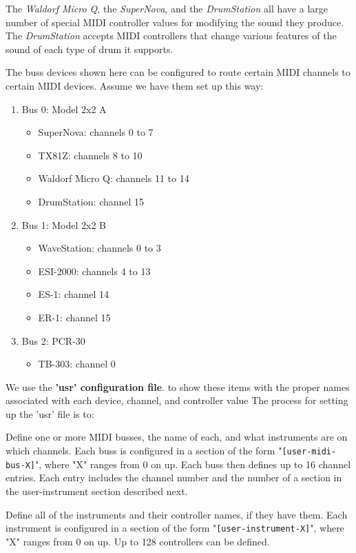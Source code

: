    The \textsl{Waldorf Micro Q},
   the \textsl{SuperNova},
   and the \textsl{DrumStation} all have a large
   number of special MIDI controller values for modifying the sound they
   produce.
   The \textsl{DrumStation} accepts MIDI controllers that change various
   features of the sound of each type of drum it supports.

   The buss devices shown here can be configured to route certain
   MIDI channels to certain MIDI devices.  Assume we have them
   set up this way:

   \begin{enumerate}
      \item Bus 0: Model 2x2 A
      \begin{itemize}
         \item SuperNova: channels 0 to 7
         \item TX81Z: channels 8 to 10
         \item Waldorf Micro Q: channels 11 to 14
         \item DrumStation: channel 15
      \end{itemize}
      \item Bus 1: Model 2x2 B
      \begin{itemize}
         \item WaveStation: channels 0 to 3
         \item ESI-2000: channels 4 to 13
         \item ES-1: channel 14
         \item ER-1: channel 15
      \end{itemize}
      \item Bus 2: PCR-30
      \begin{itemize}
         \item TB-303: channel 0
      \end{itemize}
   \end{enumerate}

   We use the \textbf{'usr' configuration file}.
   to show these items with the proper
   names associated with each device, channel, and controller value
   The process for setting up the 'usr' file is to:

   \begin{enumber}
      \item Define one or more MIDI busses, the name of each, and what
         instruments are on which channels.  Each buss is configured in a
         section of the form "\texttt{[user-midi-bus-X]}", where "X" ranges
         from 0 on up.  Each buss then defines up to 16 channel entries.
         Each entry includes the channel number and the number of a
         section in the user-instrument section described next.
      \item Define all of the instruments and their controller
         names, if they have them.  Each instrument is configured in a
         section of the form "\texttt{[user-instrument-X]}", where "X"
         ranges from 0 on up.  Up to 128 controllers can be defined.
   \end{enumber}

